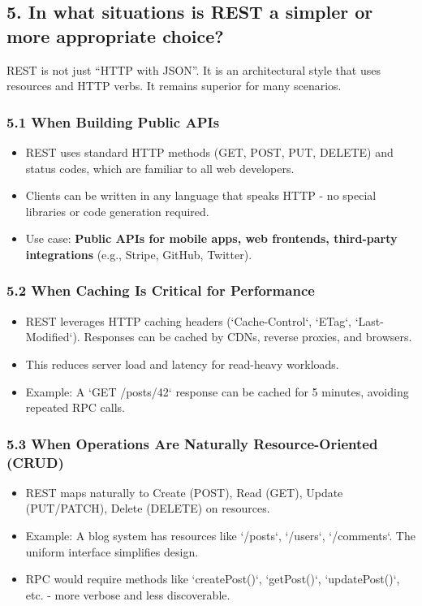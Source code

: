\documentclass[10pt,a4paper]{article}
\begin{document}
\subsection{5. In what situations is REST a simpler or more appropriate choice?}

REST is not just “HTTP with JSON”. It is an architectural style that uses resources and HTTP verbs. It remains superior for many scenarios.

\subsubsection{5.1 When Building Public APIs}
\begin{itemize}
    \item REST uses standard HTTP methods (GET, POST, PUT, DELETE) and status codes, which are familiar to all web developers.
    \item Clients can be written in any language that speaks HTTP - no special libraries or code generation required.
    \item Use case: \textbf{Public APIs for mobile apps, web frontends, third-party integrations} (e.g., Stripe, GitHub, Twitter).
\end{itemize}

\subsubsection{5.2 When Caching Is Critical for Performance}
\begin{itemize}
    \item REST leverages HTTP caching headers (`Cache-Control`, `ETag`, `Last-Modified`). Responses can be cached by CDNs, reverse proxies, and browsers.
    \item This reduces server load and latency for read-heavy workloads.
    \item Example: A `GET /posts/42` response can be cached for 5 minutes, avoiding repeated RPC calls.
\end{itemize}

\subsubsection{5.3 When Operations Are Naturally Resource-Oriented (CRUD)}
\begin{itemize}
    \item REST maps naturally to Create (POST), Read (GET), Update (PUT/PATCH), Delete (DELETE) on resources.
    \item Example: A blog system has resources like `/posts`, `/users`, `/comments`. The uniform interface simplifies design.
    \item RPC would require methods like `createPost()`, `getPost()`, `updatePost()`, etc. - more verbose and less discoverable.
\end{itemize}
\end{document}
